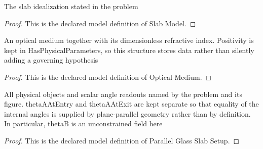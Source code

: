 \begin{definition}
  \label{def:physics:phyx-mini-0138:phyxminiproblems-problemphyxmini0138-slabmodel}
  The slab idealization stated in the problem
\end{definition}
\begin{proof}
  This is the declared model definition of Slab Model.
\end{proof}
\begin{definition}
  \label{def:physics:phyx-mini-0138:phyxminiproblems-problemphyxmini0138-opticalmedium}
  An optical medium together with its dimensionless refractive index. Positivity is kept in HasPhysicalParameters, so this structure stores data rather than silently adding a governing hypothesis
\end{definition}
\begin{proof}
  This is the declared model definition of Optical Medium.
\end{proof}
\begin{definition}
  \label{def:physics:phyx-mini-0138:phyxminiproblems-problemphyxmini0138-parallelglassslabsetup}
  All physical objects and scalar angle readouts named by the problem and its figure. thetaAAtEntry and thetaAAtExit are kept separate so that equality of the internal angles is supplied by plane-parallel geometry rather than by definition. In particular, thetaB is an unconstrained field here
\end{definition}
\begin{proof}
  This is the declared model definition of Parallel Glass Slab Setup.
\end{proof}

